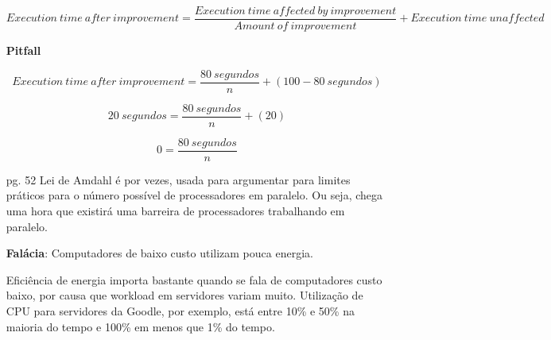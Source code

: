\documentclass{article}
\begin{document}
\begin{enumerate}
$$Execution\ time\ after\ improvement = \frac{Execution\ time\ affected\ by\ 
improvement}{Amount\ of\ improvement} + Execution\ time\ unaffected$$

\pagebreak
\begin{center}
\textbf{Pitfall}
\end{center}

$$Execution\ time\ after\ improvement =  \frac{80\ segundos}{n} + (100 - 80\ 
segundos)$$

$$20\ segundos =  \frac{80\ segundos}{n} + (20)$$

$$0 =  \frac{80\ segundos}{n}$$

\item[pg. 52] Lei de Amdahl é por vezes, usada para argumentar para limites 
práticos para o número possível de processadores em paralelo. Ou seja, chega 
uma hora que existirá uma barreira de processadores trabalhando em paralelo.

\textbf{Falácia}: Computadores de baixo custo utilizam pouca energia.

Eficiência de energia importa bastante quando se fala de computadores custo
baixo, por causa que workload em servidores variam muito. Utilização de CPU para
servidores da Goodle, por exemplo, está entre 10\% e 50\% na maioria do tempo e
100\% em menos que 1\% do tempo.

\begin{table}[ht!]
\caption{Até mesmo servidores que são utilizados 10\%, queimam próximo de dois
terços do seu pico de energia.}
\end{table}


\end{enumerate}
\end{document}
